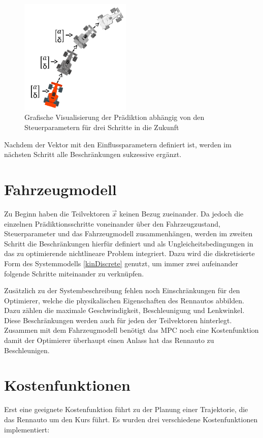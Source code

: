 \documentclass{like}
\begin{document}
  
\begin{figure}[ht!]
	\centering
	\includegraphics[width=150pt]{Abbildungen/prediction.png}
	\caption{Grafische Visualisierung der Prädiktion abhängig von den Steuerparametern für drei Schritte in die Zukunft}
	\label{fig:predictionMpc}
\end{figure}
Nachdem der Vektor mit den Einflussparametern definiert ist, werden im nächsten Schritt alle Beschränkungen sukzessive ergänzt.

\section{Fahrzeugmodell}
Zu Beginn haben die Teilvektoren $\vec{x}$ keinen Bezug zueinander. Da jedoch die einzelnen Prädiktionsschritte voneinander über den Fahrzeugzustand, Steuerparameter und das Fahrzeugmodell zusammenhängen, werden im zweiten Schritt die Beschränkungen hierfür definiert und als Ungleicheitsbedingungen in das zu optimierende nichtlineare Problem integriert. Dazu wird die diskretisierte Form des Systemmodells \ref{kinDiscrete} genutzt, um immer zwei aufeinander folgende Schritte miteinander zu verknüpfen. 

Zusätzlich zu der Systembeschreibung fehlen noch Einschränkungen für den Optimierer, welche die physikalischen Eigenschaften des Rennautos abbilden.
Dazu zählen die maximale Geschwindigkeit, Beschleunigung und Lenkwinkel. 
Diese Beschränkungen werden auch für jeden der Teilvektoren hinterlegt. 
Zusammen mit dem Fahrzeugmodell benötigt das \ac{MPC} noch eine Kostenfunktion damit der Optimierer überhaupt einen Anlass hat das Rennauto zu Beschleunigen.


\section{Kostenfunktionen}
\label{costFunctions}
Erst eine geeignete Kostenfunktion führt zu der Planung einer Trajektorie, die das Rennauto um den Kurs führt. Es wurden drei verschiedene Kostenfunktionen implementiert:
\end{document}
